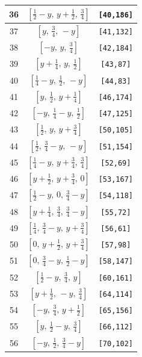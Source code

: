 \documentclass[fleqn,8pt]{jsarticle}
\begin{document}
\begin{longtable}{ccc}
36 & $\left[ \frac{1}{2} - y,\, y + \frac{1}{2},\, \frac{3}{4} \right]$ & {\tt [40,186]} \\ \hline
37 & $\left[ y,\, \frac{3}{4},\, - y \right]$ & {\tt [41,132]} \\ \hline
38 & $\left[ - y,\, y,\, \frac{3}{4} \right]$ & {\tt [42,184]} \\ \hline
39 & $\left[ y + \frac{1}{4},\, y,\, \frac{1}{2} \right]$ & {\tt [43,87]} \\ \hline
40 & $\left[ \frac{1}{4} - y,\, \frac{1}{2},\, - y \right]$ & {\tt [44,83]} \\ \hline
41 & $\left[ y,\, \frac{1}{2},\, y + \frac{1}{4} \right]$ & {\tt [46,174]} \\ \hline
42 & $\left[ - y,\, \frac{1}{4} - y,\, \frac{1}{2} \right]$ & {\tt [47,125]} \\ \hline
43 & $\left[ \frac{1}{2},\, y,\, y + \frac{3}{4} \right]$ & {\tt [50,105]} \\ \hline
44 & $\left[ \frac{1}{2},\, \frac{3}{4} - y,\, - y \right]$ & {\tt [51,154]} \\ \hline
45 & $\left[ \frac{1}{4} - y,\, y + \frac{3}{4},\, \frac{3}{4} \right]$ & {\tt [52,69]} \\ \hline
46 & $\left[ y + \frac{1}{2},\, y + \frac{3}{4},\, 0 \right]$ & {\tt [53,167]} \\ \hline
47 & $\left[ \frac{1}{2} - y,\, 0,\, \frac{3}{4} - y \right]$ & {\tt [54,118]} \\ \hline
48 & $\left[ y + \frac{1}{4},\, \frac{3}{4},\, \frac{3}{4} - y \right]$ & {\tt [55,72]} \\ \hline
49 & $\left[ \frac{1}{4},\, \frac{3}{4} - y,\, y + \frac{3}{4} \right]$ & {\tt [56,61]} \\ \hline
50 & $\left[ 0,\, y + \frac{1}{2},\, y + \frac{3}{4} \right]$ & {\tt [57,98]} \\ \hline
51 & $\left[ 0,\, \frac{3}{4} - y,\, \frac{1}{2} - y \right]$ & {\tt [58,147]} \\ \hline
52 & $\left[ \frac{1}{2} - y,\, \frac{3}{4},\, y \right]$ & {\tt [60,161]} \\ \hline
53 & $\left[ y + \frac{1}{2},\, - y,\, \frac{3}{4} \right]$ & {\tt [64,114]} \\ \hline
54 & $\left[ - y,\, \frac{3}{4},\, y + \frac{1}{2} \right]$ & {\tt [65,156]} \\ \hline
55 & $\left[ y,\, \frac{1}{2} - y,\, \frac{3}{4} \right]$ & {\tt [66,112]} \\ \hline
56 & $\left[ - y,\, \frac{1}{2},\, \frac{3}{4} - y \right]$ & {\tt [70,102]} \\ \hline

\end{longtable}
\end{document}
